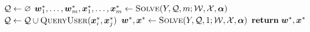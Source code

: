 \documentclass[12pt,a4paper]{article}
\begin{document}
\begin{algorithm}
\begin{algorithmic}[1]
        \State $\mathcal{Q} \gets \varnothing$
            \State $\boldsymbol{w}^*_1, \ldots, \boldsymbol{w}^*_m, \boldsymbol{x}^*_1, \ldots, \boldsymbol{x}^*_m \gets \text{{\sc Solve}}(Y, \mathcal{Q}, m; \mathcal{W}, \mathcal{X}, \boldsymbol{\alpha})$
                \State $\mathcal{Q} \gets \mathcal{Q} \cup \text{{\sc QueryUser}}(\boldsymbol{x}^*_i,\boldsymbol{x}^*_j)$
            \EndFor
        \EndFor
        \State $\boldsymbol{w}^*, \boldsymbol{x}^* \gets \text{{\sc Solve}}(Y, \mathcal{Q}, 1; \mathcal{W}, \mathcal{X}, \boldsymbol{\alpha})$
        \State ${\bf return}\; \boldsymbol{w}^*, \boldsymbol{x}^*$
    \EndProcedure
\end{algorithmic}
\end{algorithm}
\end{document}
